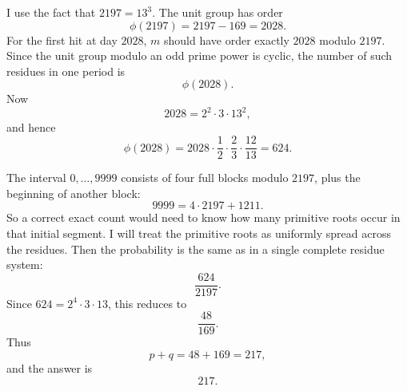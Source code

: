 I use the fact that \(2197=13^3\).  The unit group has order
\[
\phi(2197)=2197-169=2028.
\]
For the first hit at day \(2028\), \(m\) should have order exactly \(2028\) modulo \(2197\).  Since the unit group modulo an odd prime power is cyclic, the number of such residues in one period is
\[
\phi(2028).
\]
Now
\[
2028=2^2\cdot 3\cdot 13^2,
\]
and hence
\[
\phi(2028)=2028\cdot \frac12\cdot \frac23\cdot \frac{12}{13}=624.
\]

The interval \(0,\ldots,9999\) consists of four full blocks modulo \(2197\), plus the beginning of another block:
\[
9999=4\cdot2197+1211.
\]
So a correct exact count would need to know how many primitive roots occur in that initial segment.  I will treat the primitive roots as uniformly spread across the residues.  Then the probability is the same as in a single complete residue system:
\[
\frac{624}{2197}.
\]
Since \(624=2^4\cdot 3\cdot 13\), this reduces to
\[
\frac{48}{169}.
\]
Thus
\[
p+q=48+169=217,
\]
and the answer is
\[
\boxed{217}.
\]
